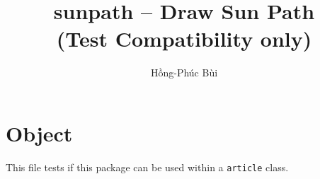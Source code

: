 \documentclass{article}
\title{
  \textsf{sunpath} -- Draw Sun Path\\
  (Test Compatibility only)
}%
\author{%
 Hồng-Phúc Bùi%
}
\begin{document}
%
\parindent0pt
%
\maketitle
\tableofcontents

\section{Object}

This file tests if this package can be used within a \texttt{article} class.


\end{document}
